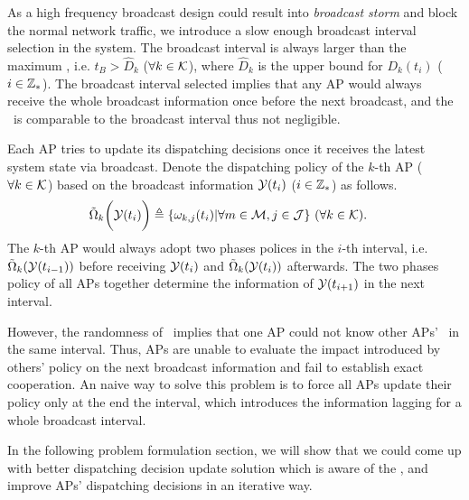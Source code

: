 As a high frequency broadcast design could result into \emph{broadcast storm} and block the normal network traffic, we introduce a slow enough broadcast interval selection in the system.
The broadcast interval is always larger than the maximum \brdelay, i.e. $t_B > \hat{D}_k$ ($\forall k\in\mathcal{K}$), where $\hat{D}_k$ is the upper bound for $D_{k}(t_{i})$ ($i\in\mathbb{Z}_{*}$).
The broadcast interval selected implies that any AP would always receive the whole broadcast information once before the next broadcast, and the \brdelay~is comparable to the broadcast interval thus not negligible.

Each AP tries to update its dispatching decisions once it receives the latest system state via broadcast.
Denote the dispatching policy of the $k$-th AP ($\forall k\in\mathcal{K}$) based on the broadcast information $\mathcal{Y}(t_{i})$ ($i \in\mathbb{Z}_{*}$) as follows.
\begin{align}
    &\tilde{\Omega}_{k}\bigg(\mathcal{Y}(t_{i})\bigg) \triangleq \{\omega_{k,j}(t_{i})|\forall m\in\mathcal{M}, j\in\mathcal{J}\}
    ~(\forall k\in\mathcal{K}).
    \label{def_action}
\end{align}
The $k$-th AP would always adopt two phases polices in the $i$-th interval, i.e. $\tilde{\Omega}_{k}(\mathcal{Y}(t_{i-1}))$ before receiving $\mathcal{Y}(t_{i})$ and $\tilde{\Omega}_{k}(\mathcal{Y}(t_{i}))$ afterwards.
The two phases policy of all APs together determine the information of $\mathcal{Y}(t_{i+1})$ in the next interval.

However, the randomness of \brdelay~implies that one AP could not know other APs' \brdelay~in the same interval.
Thus, APs are unable to evaluate the impact introduced by others' policy on the next broadcast information and fail to establish exact cooperation.
An naive way to solve this problem is to force all APs update their policy only at the end the interval, which introduces the information lagging for a whole broadcast interval.

In the following problem formulation section, we will show that we could come up with better dispatching decision update solution which is aware of the \brdelay, and improve APs' dispatching decisions in an iterative way.
